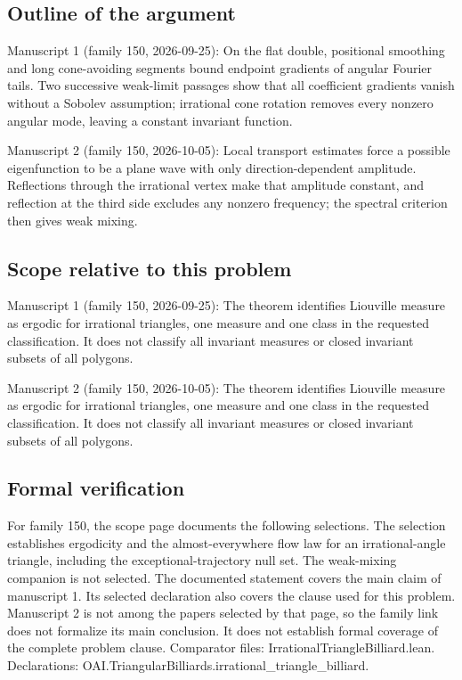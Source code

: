 \documentclass[11pt]{article}
\begin{document}
\subsection{Outline of the argument}
Manuscript 1 (family 150, 2026-09-25): On the flat double, positional smoothing and long cone-avoiding segments bound endpoint gradients of angular Fourier tails. Two successive weak-limit passages show that all coefficient gradients vanish without a Sobolev assumption; irrational cone rotation removes every nonzero angular mode, leaving a constant invariant function.

Manuscript 2 (family 150, 2026-10-05): Local transport estimates force a possible eigenfunction to be a plane wave with only direction-dependent amplitude. Reflections through the irrational vertex make that amplitude constant, and reflection at the third side excludes any nonzero frequency; the spectral criterion then gives weak mixing.

\subsection{Scope relative to this problem}
Manuscript 1 (family 150, 2026-09-25): The theorem identifies Liouville measure as ergodic for irrational triangles, one measure and one class in the requested classification. It does not classify all invariant measures or closed invariant subsets of all polygons.

Manuscript 2 (family 150, 2026-10-05): The theorem identifies Liouville measure as ergodic for irrational triangles, one measure and one class in the requested classification. It does not classify all invariant measures or closed invariant subsets of all polygons.

\subsection{Formal verification}
For family 150, the scope page documents the following selections. The selection establishes ergodicity and the almost-everywhere flow law for an irrational-angle triangle, including the exceptional-trajectory null set. The weak-mixing companion is not selected. The documented statement covers the main claim of manuscript 1. Its selected declaration also covers the clause used for this problem. Manuscript 2 is not among the papers selected by that page, so the family link does not formalize its main conclusion. It does not establish formal coverage of the complete problem clause. Comparator files: IrrationalTriangleBilliard.lean. Declarations: OAI.TriangularBilliards.irrational\_triangle\_billiard.
\end{document}
